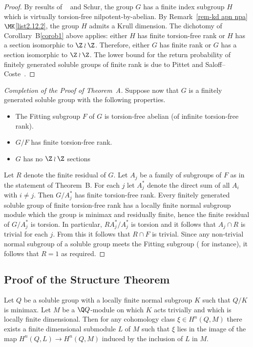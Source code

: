 \begin{proof}
By results of \Maltsev~\cite{Mal51} and Schur, the group $G$ has a finite index subgroup $H$ which is virtually torsion-free nilpotent-by-abelian. By Remark~\ref{rem-kd apn npa}$\MK$\eqref{list2.12.2}, the group $H$ admits a Krull dimension. The dichotomy of Corollary~B\ref{corob1} above applies: either $H$ has finite torsion-free rank or $H$ has a section isomorphic to $\Z\wr \Z$. Therefore, either $G$ has finite rank or $G$ has a section isomorphic to $\Z\wr\Z$. The lower bound for the return probability of finitely generated soluble groups of finite rank is due to Pittet and Saloff--Coste~\cite{PSC03}.
\end{proof}

\begin{proof}[Completion of the Proof of Theorem~A]
Suppose now that $G$ is a finitely generated soluble group with the following properties.
\begin{itemize}
\item The Fitting subgroup $F$ of $G$ is torsion-free abelian (of infinite torsion-free rank).
\item $G/F$ has finite torsion-free rank.
\item $G$ has no $\Z\wr\Z$ sections
\end{itemize}
Let $R$ denote the finite residual of $G$. Let $A_j$ be a family of subgroups of $F$ as in the statement of Theorem~B. For each $j$ let $A_j^*$ denote the direct sum of all $A_i$ with $i\ne j$. Then $G/A_j^*$ has finite torsion-free rank. Every finitely generated soluble group of finite torsion-free rank has a locally finite normal subgroup module which the group is minimax and residually finite, hence the finite residual of $G/A_j^*$ is torsion. In particular, $RA_j^*/A_j^*$ is torsion and it follows that $A_j\cap R$ is trivial for each $j$. From this it follows that $R\cap F$ is trivial. Since any non-trivial normal subgroup of a soluble group meets the Fitting subgroup (\cite[1.2.10]{LennoxRobinson} for instance), it follows that $R=1$ as required.
\end{proof}



\subsection*{Proof of the Structure Theorem}



\begin{lemm}\label{fin-dim}
Let $Q$ be a soluble group with a locally finite normal subgroup $K$ such that $Q/K$ is minimax. Let $M$ be a $\Q Q$-module on which $K$ acts trivially and which is locally finite dimensional. Then for any cohomology class $\xi\in H^n(Q,M)$ there exists a finite dimensional submodule $L$ of $M$ such that $\xi$ lies in the image of the map $H^n(Q,L)\to H^n(Q,M)$ induced by the inclusion of $L$ in $M$.
\end{lemm}

